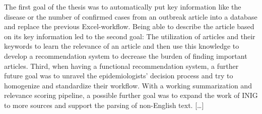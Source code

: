   The first goal of the thesis was to automatically put key information like the disease or the number of confirmed cases from an outbreak article into a database and replace the previous Excel-workflow.
  Being able to describe the article based on its key information led to the second goal: The utilization of articles and their keywords to learn the relevance of an article and then use this knowledge to develop a recommendation system to decrease the burden of finding important articles.
  Third, when having a functional recommendation system, a further future goal was to unravel the epidemiologists' decision process and try to homogenize and standardize their workflow.
  With a working summarization and relevance scoring pipeline, a possible further goal was to expand the work of INIG to more sources and support the parsing of non-English text.
  [\dots]

